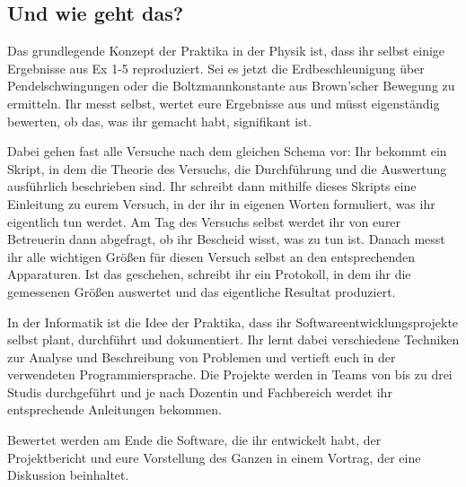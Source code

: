 \subsection{Und wie geht das?}

Das grundlegende Konzept der Praktika in der Physik ist, dass ihr selbst einige Ergebnisse aus \gls{Ex} 1-5 reproduziert. Sei es jetzt die Erdbeschleunigung über Pendelschwingungen oder die Boltzmannkonstante aus Brown'scher Bewegung zu ermitteln. Ihr messt selbst, wertet eure Ergebnisse aus und müsst eigenständig bewerten, ob das, was ihr gemacht habt, signifikant ist.

Dabei gehen fast alle Versuche nach dem gleichen Schema vor: Ihr bekommt ein Skript, in dem die Theorie des Versuchs, die Durchführung und die Auswertung ausführlich beschrieben sind. Ihr schreibt dann mithilfe dieses Skripts eine Einleitung zu eurem Versuch, in der ihr in eigenen Worten formuliert, was ihr eigentlich tun werdet. Am Tag des Versuchs selbst werdet ihr von eurer Betreuerin dann abgefragt, ob ihr Bescheid wisst, was zu tun ist. Danach messt ihr alle wichtigen Größen für diesen Versuch selbst an den entsprechenden Apparaturen. Ist das geschehen, schreibt ihr ein Protokoll, in dem ihr die gemessenen Größen auswertet und das eigentliche Resultat produziert.

In der Informatik ist die Idee der Praktika, dass ihr Softwareentwicklungsprojekte selbst plant, durchführt und dokumentiert. Ihr lernt dabei verschiedene Techniken zur Analyse und Beschreibung von Problemen und vertieft euch in der verwendeten Programmiersprache. Die Projekte werden in Teams von bis zu drei Studis durchgeführt und je nach Dozentin und Fachbereich werdet ihr entsprechende Anleitungen bekommen.

Bewertet werden am Ende die Software, die ihr entwickelt habt, der Projektbericht und eure Vorstellung des Ganzen in einem Vortrag, der eine Diskussion beinhaltet.
